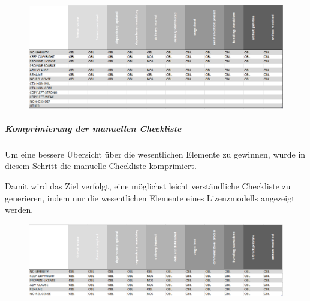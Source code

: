 \begin{figure}[p]
    \centering
    \includegraphics[angle=90, scale=1.0]{Bilder/Manuelle Checkliste.png}
\end{figure}

\newpage
\subparagraph{Komprimierung der manuellen Checkliste}

Um eine bessere Übersicht über die wesentlichen Elemente zu gewinnen, wurde in diesem Schritt die manuelle Checkliste komprimiert. 

Damit wird das Ziel verfolgt, eine möglichst leicht verständliche Checkliste zu generieren, indem nur die wesentlichen Elemente eines Lizenzmodells angezeigt werden. 

\begin{figure}[h]
    \centering
    \includegraphics[scale=0.6]{Bilder/Manuelle Checkliste_komprimiert.png}
\end{figure}





